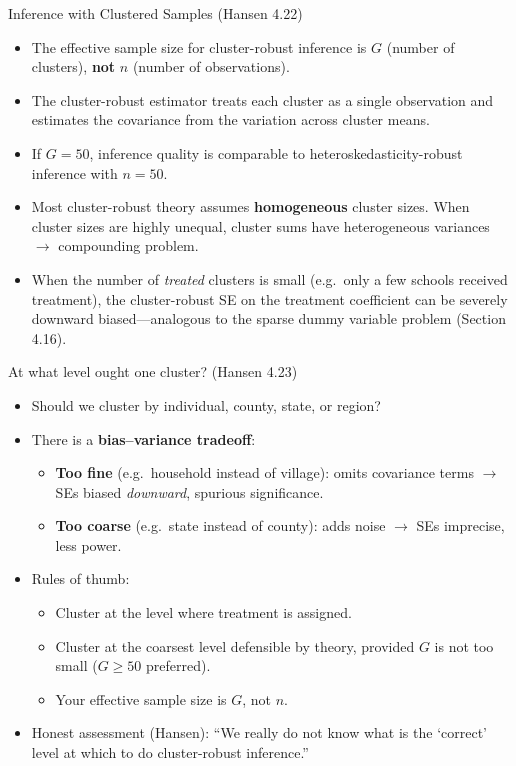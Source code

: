 \documentclass[aspectratio=169, handout, t]{beamer}
\numberwithin{equation}{section}
\begin{document}
\begin{frame}{Inference with Clustered Samples (Hansen 4.22)}
\begin{itemize}
\item The \alert{effective sample size} for cluster-robust inference is $G$ (number of clusters), \textbf{not} $n$ (number of observations). \pause
\item The cluster-robust estimator treats each cluster as a single observation and estimates the covariance from the variation across cluster means. \pause
\item If $G=50$, inference quality is comparable to heteroskedasticity-robust inference with $n=50$. \pause
\item Most cluster-robust theory assumes \textbf{homogeneous} cluster sizes.  When cluster sizes are highly unequal, cluster sums have heterogeneous variances $\rightarrow$ compounding problem. \pause
\item When the number of \emph{treated} clusters is small (e.g.\ only a few schools received treatment), the cluster-robust SE on the treatment coefficient can be severely downward biased---analogous to the sparse dummy variable problem (Section 4.16).
\end{itemize}
\end{frame}

\begin{frame}{At what level ought one cluster? (Hansen 4.23)}
\begin{itemize}
\item Should we cluster by individual, county, state, or region?
\item There is a \textbf{bias--variance tradeoff}: \pause
\begin{itemize}
\item \textbf{Too fine} (e.g.\ household instead of village): omits covariance terms $\rightarrow$ SEs biased \emph{downward}, spurious significance. \pause
\item \textbf{Too coarse} (e.g.\ state instead of county): adds noise $\rightarrow$ SEs imprecise, less power. \pause
\end{itemize}
\item Rules of thumb:
\begin{itemize}
\item Cluster at the level where treatment is assigned.
\item Cluster at the coarsest level defensible by theory, provided $G$ is not too small ($G\geq 50$ preferred).
\item Your effective sample size is $G$, not $n$.
\end{itemize}\pause
\item \alert{Honest assessment} (Hansen): ``We really do not know what is the `correct' level at which to do cluster-robust inference.''
\end{itemize}
 \end{frame}
 
\end{document}
